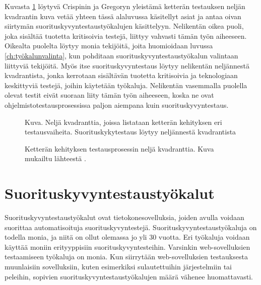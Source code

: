 Kuvasta \ref{fig:agilequadrants} löytyvä Crispinin ja Gregoryn yleistämä ketterän testauksen neljän kvadrantin kuva vetää yhteen tässä alaluvussa käsitellyt asiat ja antaa oivan siirtymän suorituskyvyntestaustyökalujen käsittelyyn. Nelikentän oikea puoli, joka sisältää tuotetta kritisoivia testejä, liittyy vahvasti tämän työn aiheeseen. Oikealta puolelta löytyy monia tekijöitä, joita huomioidaan luvussa \ref{ch:työkalunvalinta}, kun pohditaan suorituskyvyntestaustyökalun valintaan liittyviä tekijöitä. Myös itse suorituskyvyntestaus löytyy nelikentän neljännestä kvadrantista, jonka kerrotaan sisältävän tuotetta kritisoivia ja teknologiaan keskittyviä testejä, joihin käytetään työkaluja. Nelikentän vasemmalla puolella olevat testit eivät suoraan liity tämän työn aiheeseen, koska ne ovat ohjelmistotestausprosessissa paljon aiempana kuin suorituskyvyntestaus.  

\begin{figure}[H]
\centering
\pdftooltip{}
{Kuva. Neljä kvadranttia, joissa listataan ketterän kehityksen eri testausvaiheita. Suorituskykytestaus löytyy neljännestä kvadrantista}
\caption{Ketterän kehityksen testausprosessin neljä kvadranttia. Kuva mukailtu lähteestä \cite[97]{AgileTestingAPracticalGuide}.}
\label{fig:agilequadrants}
\end{figure}



\section{Suorituskyvyntestaustyökalut}
\label{sec:suorituskyvyntestaustyökalut}
Suorituskyvyntestaustyökalut ovat tietokonesovelluksia, joiden avulla voidaan suorittaa automatisoituja suorituskyvyntestejä. Suorituskyvyntestaustyökaluja on todella monia, ja niitä on ollut olemassa jo yli 30 vuotta. Eri työkaluja voidaan käyttää moniin erityyppisiin suorituskyvyntesteihin. Varsinkin web-sovelluksien testaamiseen työkaluja on monia. Kun siirrytään web-sovelluksien testauksesta muunlaisiin sovelluksiin, kuten esimerkiksi sulautettuihin järjestelmiin tai peleihin, sopivien suorituskyvyntestaustyökalujen määrä vähenee huomattavasti. \parencite[11-12]{TheArtOfApplication}


